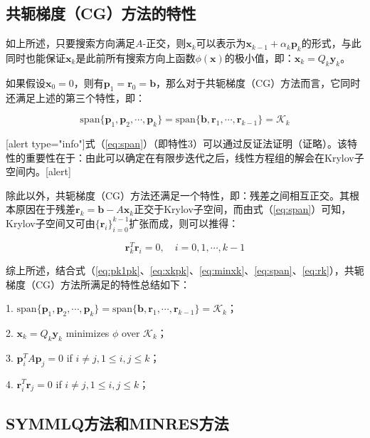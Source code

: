 \documentclass[UTF8,nofonts]{ctexart}
\begin{document}
\subsection*{共轭梯度（CG）方法的特性}

如上所述，只要搜索方向满足$A$-正交，则$\boldsymbol{x}_k$可以表示为$\boldsymbol{x}_{k-1}+\alpha_k\boldsymbol{p}_k$的形式，与此同时也能保证$\boldsymbol{x}_k$是此前所有搜索方向上函数$\phi(\boldsymbol{x})$的极小值，即：$\boldsymbol{x}_k=Q_k\boldsymbol{y}_k$。

如果假设$\boldsymbol{x}_0=0$，则有$\boldsymbol{p}_1=\boldsymbol{r}_0=\boldsymbol{b}$，那么对于共轭梯度（CG）方法而言，它同时还满足上述的第三个特性，即：

\begin{equation}
	\label{eq:span}
	\text{span}\{\boldsymbol{p}_1,\boldsymbol{p}_2,\cdots,\boldsymbol{p}_k\} =
	\text{span}\{\boldsymbol{b},\boldsymbol{r}_1,\cdots,\boldsymbol{r}_{k-1}\} =
	\mathcal{K}_k
\end{equation}

[alert type="info"]式（\ref{eq:span}）（即特性$3$）可以通过反证法证明（证略）。该特性的重要性在于：由此可以确定在有限步迭代之后，线性方程组的解会在Krylov子空间内。[alert]

除此以外，共轭梯度（CG）方法还满足一个特性，即：残差之间相互正交。其根本原因在于残差$\boldsymbol{r}_k=\boldsymbol{b}-A\boldsymbol{x}_k$正交于Krylov子空间，而由式（\ref{eq:span}）可知，Krylov子空间又可由$\{\boldsymbol{r}_i\}_{i=0}^{k-1}$扩张而成，则可以推得：

\begin{equation}
	\label{eq:rk}
	\boldsymbol{r}_k^T\boldsymbol{r}_i=0,\quad i=0,1,\cdots,k-1
\end{equation}

综上所述，结合式（\ref{eq:pk1pk}、\ref{eq:xkpk}、\ref{eq:minxk}、\ref{eq:span}、\ref{eq:rk}），共轭梯度（CG）方法所满足的特性总结如下：

1. $\text{span}\{\boldsymbol{p}_1,\boldsymbol{p}_2,\cdots,\boldsymbol{p}_k\} =
\text{span}\{\boldsymbol{b},\boldsymbol{r}_1,\cdots,\boldsymbol{r}_{k-1}\} =
\mathcal{K}_k$；

2. $\boldsymbol{x}_k=Q_k\boldsymbol{y}_k$ minimizes $\phi$ over $\mathcal{K}_k$；

3. $\boldsymbol{p}_{i}^TA\boldsymbol{p}_j=0$ if $i \neq j,1 \leq i,j \leq k$；

4. $\boldsymbol{r}_i^T\boldsymbol{r}_j=0$ if $i \neq j,1 \leq i,j \leq k$；

\subsection*{SYMMLQ方法和MINRES方法}
\end{document}
